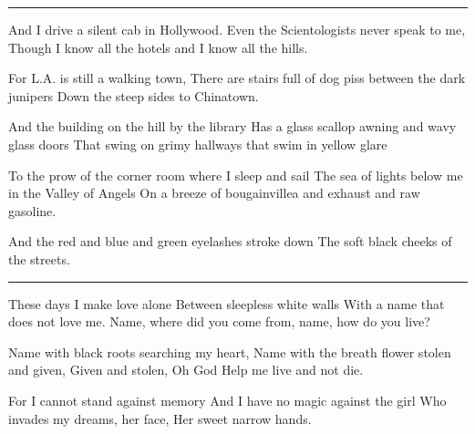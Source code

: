 \documentclass[english,11pt,letterpaper,onecolumn]{scrbook}
\begin{document}
\begin{poem}
\begin{center}\rule[3pt]{2in}{0.5pt}\end{center}

\begin{stanza}
And I drive a silent cab in Hollywood.\verseline
Even the Scientologists never speak to me,\verseline
Though I know all the hotels and I know all the hills.
\end{stanza}

\begin{stanza}
For L.A. is still a walking town,\verseline
There are stairs full of dog piss between the dark junipers \verseline
Down the steep sides to Chinatown.
\end{stanza}

\begin{stanza}
And the building on the hill by the library\verseline
Has a glass scallop awning and wavy glass doors\verseline
That swing on grimy hallways that swim in yellow glare
\end{stanza}

\begin{stanza}
To the prow of the corner room where I sleep and sail \verseline
The sea of lights below me in the Valley of Angels\verseline
On a breeze of bougainvillea and exhaust and raw gasoline.
\end{stanza}

\begin{stanza}
And the red and blue and green eyelashes stroke down \verseline
The soft black cheeks of the streets.
\end{stanza}

\begin{center}\rule[3pt]{2in}{0.5pt}\end{center}

\begin{stanza}
These days I make love alone \verseline
Between sleepless white walls\verseline
With a name that does not love me.\verseline
Name, where did you come from, name, how do you live?
\end{stanza}

\begin{stanza}
Name with black roots searching my heart,\verseline
Name with the breath flower stolen and given,\verseline
Given and stolen, Oh God\verseline
Help me live and not die.
\end{stanza}

\begin{stanza}
For I cannot stand against memory \verseline
And I have no magic against the girl \verseline
Who invades my dreams, her face, \verseline
Her sweet narrow hands.
\end{stanza}


\end{poem}
\end{document}
